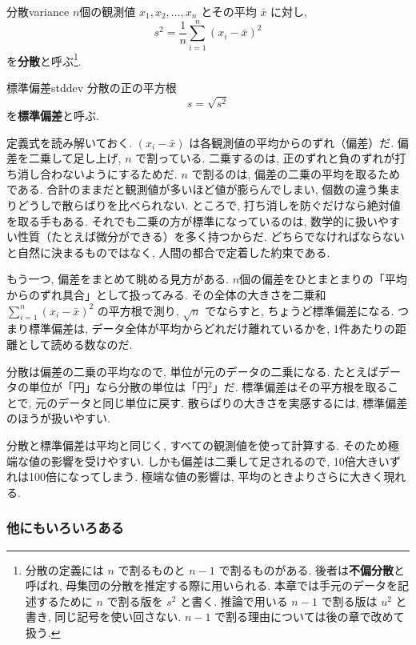     \begin{defi}{分散}{variance}
      $n$個の観測値 $x_1, x_2, \ldots, x_n$ とその平均 $\bar{x}$ に対し,
      \[
        s^2 = \frac{1}{n} \sum_{i=1}^{n} (x_i - \bar{x})^2
      \]
      を\textbf{分散}と呼ぶ\footnote{%
        分散の定義には $n$ で割るものと $n-1$ で割るものがある.
        後者は\textbf{不偏分散}と呼ばれ, 母集団の分散を推定する際に用いられる.
        本章では手元のデータを記述するために $n$ で割る版を $s^2$ と書く.
        推論で用いる $n-1$ で割る版は $u^2$ と書き, 同じ記号を使い回さない.
        $n-1$ で割る理由については後の章で改めて扱う.}.
    \end{defi}

    \begin{defi}{標準偏差}{stddev}
      分散の正の平方根
      \[
        s = \sqrt{s^2}
      \]
      を\textbf{標準偏差}と呼ぶ.
    \end{defi}

    定義式を読み解いておく.
    $(x_i - \bar{x})$ は各観測値の平均からのずれ（偏差）だ.
    偏差を二乗して足し上げ, $n$ で割っている.
    二乗するのは, 正のずれと負のずれが打ち消し合わないようにするためだ.
    $n$ で割るのは, 偏差の二乗の平均を取るためである.
    合計のままだと観測値が多いほど値が膨らんでしまい, 個数の違う集まりどうしで散らばりを比べられない.
    ところで, 打ち消しを防ぐだけなら絶対値を取る手もある.
    それでも二乗の方が標準になっているのは, 数学的に扱いやすい性質（たとえば微分ができる）を多く持つからだ.
    どちらでなければならないと自然に決まるものではなく, 人間の都合で定着した約束である.

    もう一つ, 偏差をまとめて眺める見方がある.
    $n$個の偏差をひとまとまりの「平均からのずれ具合」として扱ってみる.
    その全体の大きさを二乗和 $\sum_{i=1}^{n}(x_i - \bar{x})^2$ の平方根で測り, $\sqrt{n}$ でならすと, ちょうど標準偏差になる.
    つまり標準偏差は, データ全体が平均からどれだけ離れているかを, 1件あたりの距離として読める数なのだ.

    分散は偏差の二乗の平均なので, 単位が元のデータの二乗になる.
    たとえばデータの単位が「円」なら分散の単位は「円${}^2$」だ.
    標準偏差はその平方根を取ることで, 元のデータと同じ単位に戻す.
    散らばりの大きさを実感するには, 標準偏差のほうが扱いやすい.

    分散と標準偏差は平均と同じく, すべての観測値を使って計算する.
    そのため極端な値の影響を受けやすい.
    しかも偏差は二乗して足されるので, 10倍大きいずれは100倍になってしまう.
    極端な値の影響は, 平均のときよりさらに大きく現れる.

    \subsubsection*{他にもいろいろある}

